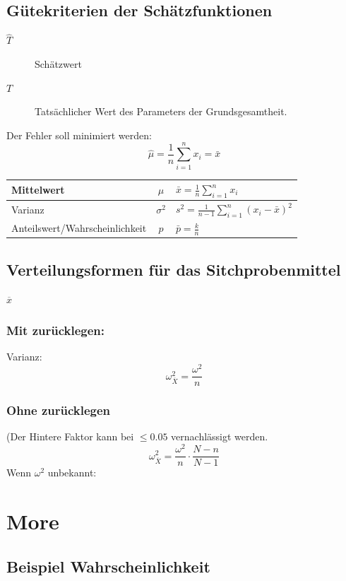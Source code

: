 \subsection{Gütekriterien der Schätzfunktionen}

\begin{description}
	\item[$\hat{T}$] Schätzwert
	\item[$T$] Tatsächlicher Wert des Parameters der Grundsgesamtheit.
\end{description}

Der Fehler soll minimiert werden:
\[
\hat\mu = \frac{1}{n} \sum^n_{i=1}{x_i} = \bar{x}
\]


\begin{tabu}{ l | c | X}
Mittelwert & $\mu$ & $ \bar{x} = \frac{1}{n} \sum^n_{i=1}{x_i} $ \\
\hline
Varianz & $\sigma^2$ & $ s^2 = \frac{1}{n-1} \sum^n_{i=1}{(x_i - \bar{x})^2} $ \\
\hline
Anteilswert/Wahrscheinlichkeit & $p$ & $ \bar{p} = \frac{k}{n} $ \\
\end{tabu}

\subsection{Verteilungsformen für das Sitchprobenmittel}

$\overline{x}$

\subsubsection{Mit zurücklegen:}
	Varianz:
\[
	\omega_{\overline{X}}^{2} = \frac{\omega^2}{n}
\]
	
\subsubsection{Ohne zurücklegen}

(Der Hintere Faktor kann bei $\leq 0.05$ vernachlässigt werden.
\[
	\omega^2_{\overline{X}} = \frac{\omega^2}{n} \cdot \frac{N -n}{N-1}
\]
Wenn $\omega^2$ unbekannt:



\section{More}

\subsection{Beispiel Wahrscheinlichkeit}
	
